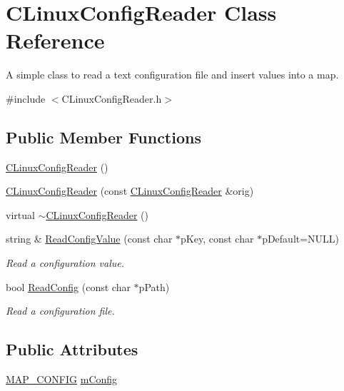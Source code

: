 \hypertarget{class_c_linux_config_reader}{\section{\-C\-Linux\-Config\-Reader \-Class \-Reference}
\label{class_c_linux_config_reader}
}


\-A simple class to read a text configuration file and insert values into a map.  




{\ttfamily \#include $<$\-C\-Linux\-Config\-Reader.\-h$>$}

\subsection*{\-Public \-Member \-Functions}
\begin{DoxyCompactItemize}
\item 
\hyperlink{class_c_linux_config_reader_ab181efdcb1824be8b1cf38a54053aa7c}{\-C\-Linux\-Config\-Reader} ()
\item 
\hyperlink{class_c_linux_config_reader_aefb1c89d21c6d06efb1e02a6ed094b97}{\-C\-Linux\-Config\-Reader} (const \hyperlink{class_c_linux_config_reader}{\-C\-Linux\-Config\-Reader} \&orig)
\item 
virtual \hyperlink{class_c_linux_config_reader_ad7396095dad86606810340020a1ff134}{$\sim$\-C\-Linux\-Config\-Reader} ()
\item 
string \& \hyperlink{class_c_linux_config_reader_a59518fa860146b7f68ba32cafa2c4273}{\-Read\-Config\-Value} (const char $\ast$p\-Key, const char $\ast$p\-Default=\-N\-U\-L\-L)
\begin{DoxyCompactList}\small\item\em \-Read a configuration value. \end{DoxyCompactList}\item 
bool \hyperlink{class_c_linux_config_reader_a829a515ae74b4fffbb4f46f9df5a7b1f}{\-Read\-Config} (const char $\ast$p\-Path)
\begin{DoxyCompactList}\small\item\em \-Read a configuration file. \end{DoxyCompactList}\end{DoxyCompactItemize}
\subsection*{\-Public \-Attributes}
\begin{DoxyCompactItemize}
\item 
\hyperlink{_c_linux_config_reader_8h_a7d59549d525077addf7d663740c64211}{\-M\-A\-P\-\_\-\-C\-O\-N\-F\-I\-G} \hyperlink{class_c_linux_config_reader_a5472374c38b0de2e816345f9d4c8112d}{m\-Config}
\end{DoxyCompactItemize}


